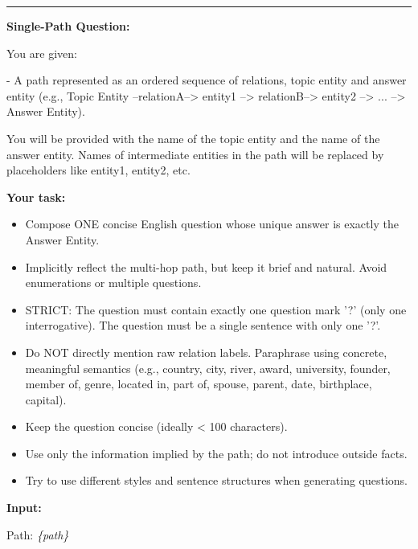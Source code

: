 \begin{tcolorbox}[
  colback=white,
  colframe=blue!60,
  colbacktitle=blue!30,
  coltitle=white,
  fonttitle=\bfseries\scriptsize,
  fontupper=\scriptsize,
  title=Question Generation Prompts,
  rounded corners,
  boxrule=0.5pt
]
\vspace{0.5em}
\hrule
\vspace{0.3em}

\textbf{Single-Path Question:}

You are given:

- A path represented as an ordered sequence of relations, topic entity and answer entity (e.g., Topic Entity --relationA--> entity1 --> relationB--> entity2 --> ... --> Answer Entity).

You will be provided with the name of the topic entity and the name of the answer entity. Names of intermediate entities in the path will be replaced by placeholders like entity1, entity2, etc.

\textbf{Your task:}
\begin{itemize}
  \item Compose ONE concise English question whose unique answer is exactly the Answer Entity.
  \item Implicitly reflect the multi-hop path, but keep it brief and natural. Avoid enumerations or multiple questions.
  \item STRICT: The question must contain exactly one question mark '?' (only one interrogative). The question must be a single sentence with only one '?'.
  \item Do NOT directly mention raw relation labels. Paraphrase using concrete, meaningful semantics (e.g., country, city, river, award, university, founder, member of, genre, located in, part of, spouse, parent, date, birthplace, capital).
  \item Keep the question concise (ideally < 100 characters).
  \item Use only the information implied by the path; do not introduce outside facts.
  \item Try to use different styles and sentence structures when generating questions.
\end{itemize}

\textbf{Input:}

Path: \textcolor{teal!70!black}{\textit{\{path\}}}


\end{tcolorbox}
